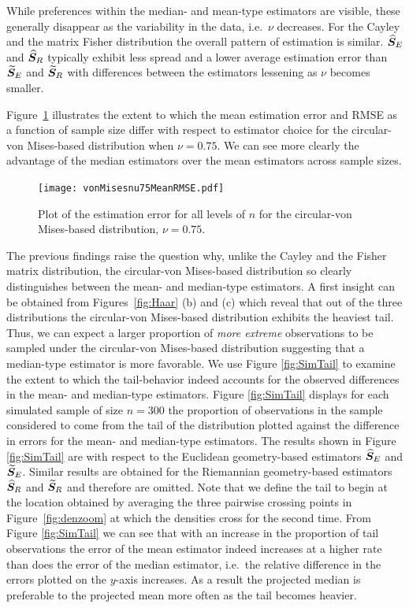 While preferences within the median- and mean-type estimators are visible, these generally disappear as the variability in the data, i.e.~$\nu$ decreases.  For the Cayley and the matrix Fisher distribution the overall pattern of estimation is similar. ${\widehat{\bm S}_E}$ and ${\widehat{\bm S}_R}$ typically exhibit less spread and a lower average estimation error than ${\widetilde{\bm S}_E}$ and ${\widetilde{\bm S}_R}$ with differences between the estimators lessening as $\nu$ becomes smaller.

Figure~\ref{fig:vmnu75} illustrates the extent to which the mean estimation error and RMSE as a function of sample size differ with respect to estimator choice for the circular-von Mises-based distribution when $\nu=0.75$.  We can see more clearly the advantage of the median estimators over the mean estimators across sample sizes.

\begin{figure}[h!]
\centering
\texttt{[image: vonMisesnu75MeanRMSE.pdf]}\vspace{-1em}
\caption{Plot of the estimation error for all levels of $n$ for the circular-von Mises-based distribution,  $\nu=0.75$.}  \label{fig:vmnu75}
\end{figure}%

The previous findings raise the question why, unlike the Cayley and the Fisher matrix distribution, the circular-von Mises-based distribution so clearly distinguishes between the mean- and median-type estimators. A first insight can be obtained from Figures~\ref{fig:Haar} (b) and (c) which reveal that out of the three distributions the circular-von Mises-based distribution exhibits the heaviest tail. Thus, we can expect a larger proportion of   \textit{more extreme} observations to be sampled under the circular-von Mises-based distribution suggesting that a median-type estimator is more favorable. 
We use Figure \ref{fig:SimTail} to examine the extent to which the tail-behavior indeed accounts for the observed differences in the mean- and median-type estimators. Figure \ref{fig:SimTail} displays for each simulated sample of size $n=300$ the proportion of observations in the sample considered to come from the tail of the distribution plotted against the difference in errors for the mean- and median-type estimators.  The results shown in Figure \ref{fig:SimTail} are with respect to the Euclidean geometry-based estimators ${\widehat{\bm S}_E}$ and ${\widetilde{\bm S}_E}$. Similar results are obtained for the Riemannian geometry-based estimators ${\widehat{\bm S}_R}$ and ${\widetilde{\bm S}_R}$ and therefore are omitted. Note that we define the tail to begin at the location obtained by averaging the three pairwise crossing points in Figure~\ref{fig:denzoom} at which the densities cross for the second time. From Figure \ref{fig:SimTail} we can see that with an increase in the proportion of tail observations the error of the mean estimator indeed increases at a higher rate than does the error of the median estimator, i.e.~the relative difference in the errors plotted on the $y$-axis increases. As a result the projected median is preferable to the projected mean more often as the tail becomes heavier.\\
 
